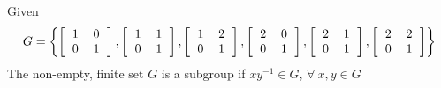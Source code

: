 \documentclass[paper=usletter, fontsize=12pt]{article}
\begin{document}
\begin{itemize}
\begin{itemize}
\begin{cproof}
                Given
                \begin{equation*}
                    G = \left\{
                        \left[\begin{tabular}{cc}
                            1 & 0 \\
                            0 & 1
                        \end{tabular}\right],
                        \left[\begin{tabular}{cc}
                            1 & 1 \\
                            0 & 1
                        \end{tabular}\right],
                        \left[\begin{tabular}{cc}
                            1 & 2 \\
                            0 & 1
                        \end{tabular}\right],
                        \left[\begin{tabular}{cc}
                            2 & 0 \\
                            0 & 1
                        \end{tabular}\right],
                        \left[\begin{tabular}{cc}
                            2 & 1 \\
                            0 & 1
                        \end{tabular}\right],
                        \left[\begin{tabular}{cc}
                            2 & 2 \\
                            0 & 1
                        \end{tabular}\right]
                    \right\}
                \end{equation*}
                The non-empty, finite set $G$ is a subgroup if $xy^{-1} \in G$, $\forall \ x,y \in G$\\


\end{cproof}
\end{itemize}
\end{itemize}
\end{document}
